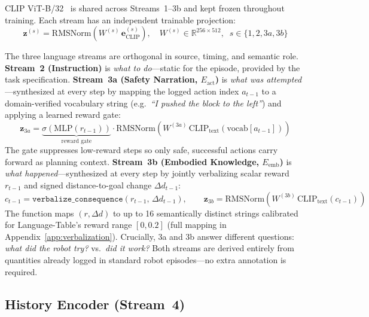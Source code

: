 \documentclass{article}
\newcommand{\Lact}{$E_{\mathrm{act}}$\xspace}
\newcommand{\Lexp}{$E_{\mathrm{emb}}$\xspace}
\begin{document}
CLIP ViT-B/32~\citep{radford2021clip,dosovitskiy2021vit} is shared across
Streams~1--3b and kept frozen throughout training.
Each stream has an independent trainable projection:
\begin{equation}
  \mathbf{z}^{(s)} = \mathrm{RMSNorm}(W^{(s)}\,\mathbf{e}^{(s)}_{\mathrm{CLIP}}),
  \quad W^{(s)}\!\in\!\mathbb{R}^{256\times512}, \;\; s\in\{1,2,3a,3b\}
  \label{eq:proj}
\end{equation}

The three language streams are orthogonal in source, timing, and semantic role.
\textbf{Stream~2 (Instruction)} is \emph{what to do}---static for the
episode, provided by the task specification.
\textbf{Stream~3a (Safety Narration, \Lact)} is \emph{what was attempted}---synthesized
at every step by mapping the logged action index $a_{t-1}$ to a domain-verified
vocabulary string (e.g.\ \textit{``I pushed the block to the left''}) and
applying a learned reward gate:
\begin{equation}
  \mathbf{z}_{3a} = \underbrace{\sigma\!\left(\mathrm{MLP}(r_{t-1})\right)}_{\text{reward gate}} \cdot
                    \mathrm{RMSNorm}(W^{(3a)}\,
                    \mathrm{CLIP}_{\mathrm{text}}(\mathrm{vocab}[a_{t-1}]))
  \label{eq:action_enc}
\end{equation}
The gate suppresses low-reward steps so only safe, successful actions carry
forward as planning context.
\textbf{Stream~3b (Embodied Knowledge, \Lexp)} is \emph{what happened}---synthesized
at every step by jointly verbalizing scalar reward $r_{t-1}$ and signed
distance-to-goal change $\Delta d_{t-1}$:
\begin{equation}
  c_{t-1} = \texttt{verbalize\_consequence}(r_{t-1},\,\Delta d_{t-1}), \qquad
  \mathbf{z}_{3b} = \mathrm{RMSNorm}(W^{(3b)}\,\mathrm{CLIP}_{\mathrm{text}}(c_{t-1}))
  \label{eq:experience_enc}
\end{equation}
The function maps $(r, \Delta d)$ to up to 16 semantically distinct strings
calibrated for Language-Table's reward range $[0,0.2]$ (full mapping in
Appendix~\ref{app:verbalization}).
Crucially, 3a and 3b answer different questions: \emph{what did the robot try?}
vs.\ \emph{did it work?}
Both streams are derived entirely from quantities already logged in standard
robot episodes---no extra annotation is required.

\subsection{History Encoder (Stream~4)}
\end{document}
